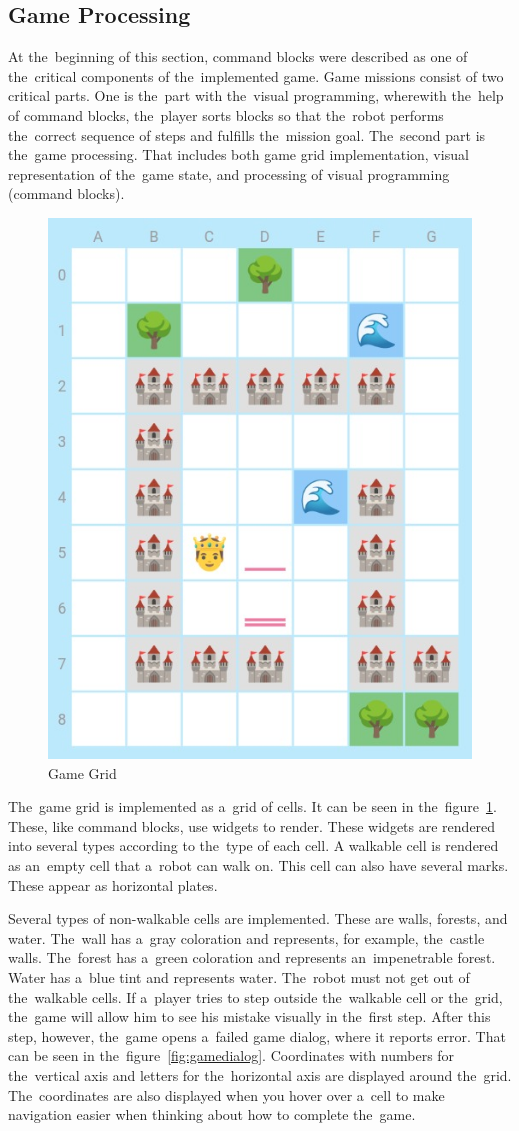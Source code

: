 \subsection{Game Processing}

At the~beginning of this section, command blocks were described as one of the~critical components of the~implemented game.
Game missions consist of two critical parts.
One is the~part with the~visual programming, wherewith the~help of command blocks, the~player sorts blocks so that the~robot performs the~correct sequence of steps and fulfills the~mission goal.
The~second part is the~game processing.
That includes both game grid implementation, visual representation of the~game state, and processing of visual programming (command blocks).

\begin{figure}
    \centering
    \includegraphics[width=0.5\linewidth]{assets/implementation/gamegrid.jpeg}
    \caption{Game Grid}
    \label{fig:gamegrid}
\end{figure}

The~game grid is implemented as a~grid of cells.
It can be seen in the~figure~\ref{fig:gamegrid}.
These, like command blocks, use widgets to render.
These widgets are rendered into several types according to the~type of each cell.
A walkable cell is rendered as an~empty cell that a~robot can walk on.
This cell can also have several marks.
These appear as horizontal plates.

Several types of non-walkable cells are implemented.
These are walls, forests, and water.
The~wall has a~gray coloration and represents, for example, the~castle walls.
The~forest has a~green coloration and represents an~impenetrable forest.
Water has a~blue tint and represents water.
The~robot must not get out of the~walkable cells.
If a~player tries to step outside the~walkable cell or the~grid, the~game will allow him to see his mistake visually in the~first step.
After this step, however, the~game opens a~failed game dialog, where it reports error.
That can be seen in the~figure~\ref{fig:gamedialog}.
Coordinates with numbers for the~vertical axis and letters for the~horizontal axis are displayed around the~grid.
The~coordinates are also displayed when you hover over a~cell to make navigation easier when thinking about how to complete the~game.

